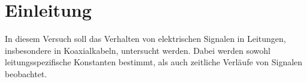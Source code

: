 
\section{Einleitung}
In diesem Versuch soll das Verhalten von elektrischen Signalen in 
Leitungen, insbesondere in Koaxialkabeln, untersucht werden.
Dabei werden sowohl leitungsspezifische Konstanten bestimmt, 
als auch zeitliche Verläufe von Signalen beobachtet.
\FloatBarrier